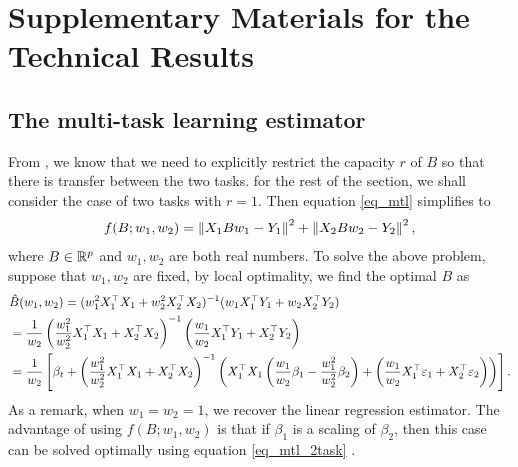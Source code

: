 \section{Supplementary Materials for the Technical Results}\label{app_proof_sec3}

\subsection{The multi-task learning estimator}
From \cite{WZR20}, we know that we need to explicitly restrict the capacity $r$ of $B$ so that there is transfer between the two tasks.
for the rest of the section, we shall consider the case of two tasks with $r=1$. 
Then equation \eqref{eq_mtl} simplifies to 
\begin{align}\label{eq_mtl_2task}
	f(B; w_1, w_2) = \left\| X_1 B w_1 - Y_1 \right\|^2 + \left\| X_2 B w_2 - Y_2 \right\|^2,
\end{align}
where $B\in\mathbb{R}^p$ and $w_1, w_2$ are both real numbers. To solve the above problem, suppose that $w_1, w_2$ are fixed, by local optimality, we find the optimal $B$ as
\begin{align}
	& \hat{B}(w_1, w_2) = (w_1^2 X_1^{\top}X_1 + w_2^2 X_2^{\top}X_2)^{-1} (w_1 X_1^{\top}Y_1 + w_2 X_2^{\top}Y_2) \label{hatB}\\
	&= \frac{1}{w_2} \left( \frac{w_1^2}{w_2^2}  X_1^{\top}X_1 + X_2^{\top}X_2\right)^{-1} \left(\frac{w_1}{w_2} X_1^{\top}Y_1 + X_2^{\top}Y_2\right) \nonumber\\
	&= \frac{1}{w_2}\left[\beta_t + \left(\frac{w_1^2}{w_2^2} X_1^{\top}X_1 + X_2^{\top}X_2\right)^{-1}\left({X_1^{\top}X_1\left(\frac{w_1}{w_2}\beta_1 - \frac{w_1^2}{w_2^2} \beta_2\right) + \left(\frac{w_1}{w_2} X_1^{\top}\varepsilon_1 + X_2^{\top}\varepsilon_2\right)}\right)\right]. \nonumber
\end{align}
As a remark, when $w_1 = w_2 = 1$, we recover the linear regression estimator.
The advantage of using $f(B; w_1, w_2)$ is that if $\beta_1$ is a scaling of $\beta_2$, then this case can be solved optimally using equation \eqref{eq_mtl_2task} \cite{KD12}.


